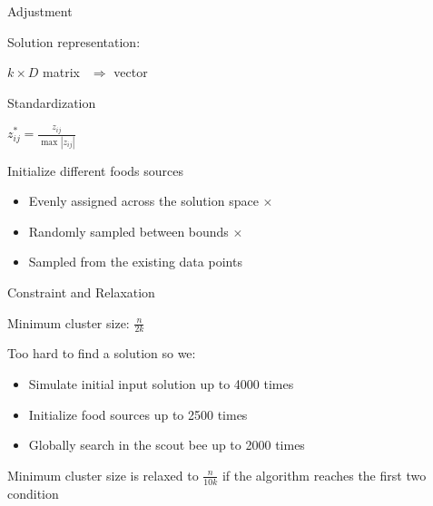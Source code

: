 \documentclass[14pt,ignorenonframetext,compress]{beamer}
\providecommand{\tightlist}{%
  \setlength{\itemsep}{0pt}\setlength{\parskip}{0pt}}
\begin{document}
\begin{frame}{Adjustment}
\protect\hypertarget{adjustment}{}

\begin{block}{Solution representation:}

\(k\times D\) matrix \pause  \(\ \ \Rightarrow\) vector

\pause

\end{block}

\begin{block}{Standardization}

\(z^*_{ij} = \frac{z_{ij}}{\max_{}|z_{ij}|}\)

\pause

\end{block}

\begin{block}{Initialize different foods sources}

\begin{itemize}
\tightlist
\item
  Evenly assigned across the solution space \(\times\)
\item
  Randomly sampled between bounds \(\times\) \pause
\item
  Sampled from the existing data points
\end{itemize}

\end{block}

\end{frame}

\begin{frame}{Constraint and Relaxation}
\protect\hypertarget{constraint-and-relaxation}{}

Minimum cluster size: \(\frac{n}{2k}\)

Too hard to find a solution so we:

\begin{itemize}
\tightlist
\item
  Simulate initial input solution up to 4000 times
\item
  Initialize food sources up to 2500 times
\item
  Globally search in the scout bee up to 2000 times
\end{itemize}

\pause

Minimum cluster size is relaxed to \(\frac{n}{10k}\) if the algorithm
reaches the first two condition

\end{frame}
\end{document}
